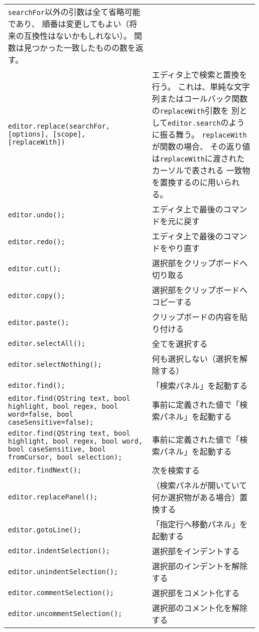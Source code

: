 \begin{longtable}{XX}
    \texttt{searchFor}以外の引数は全て省略可能であり、
    順番は変更してもよい（将来の互換性はないかもしれない）。
    関数は見つかった一致したものの数を返す。\\
  \texttt{editor.replace(searchFor, {[}options{]}, {[}scope{]}, {[}replaceWith{]})}
    & エディタ上で検索と置換を行う。
    これは、単純な文字列またはコールバック関数の\texttt{replaceWith}引数を
    別として\texttt{editor.search}のように振る舞う。
    \texttt{replaceWith}が関数の場合、
    その返り値は\texttt{replaceWith}に渡されたカーソルで表される
    一致物を置換するのに用いられる。\\
  \texttt{editor.undo();} & エディタ上で最後のコマンドを元に戻す\\
  \texttt{editor.redo();} & エディタ上で最後のコマンドをやり直す\\
  \texttt{editor.cut();} & 選択部をクリップボードへ切り取る\\
  \texttt{editor.copy();} & 選択部をクリップボードへコピーする\\
  \texttt{editor.paste();} & クリップボードの内容を貼り付ける\\
  \texttt{editor.selectAll();} & 全てを選択する\\
  \texttt{editor.selectNothing();} & 何も選択しない（選択を解除する）\\
  \texttt{editor.find();} & 「検索パネル」を起動する\\
  \texttt{editor.find(QString text, bool highlight, bool regex, bool word=false, bool caseSensitive=false);}
    & 事前に定義された値で「検索パネル」を起動する\\
  \texttt{editor.find(QString text, bool highlight, bool regex, bool word, bool caseSensitive, bool fromCursor, bool selection);}
    & 事前に定義された値で「検索パネル」を起動する\\
  \texttt{editor.findNext();} & 次を検索する\\
  \texttt{editor.replacePanel();} & （検索パネルが開いていて何か選択物がある場合）置換する\\
  \texttt{editor.gotoLine();} & 「指定行へ移動パネル」を起動する\\
  \texttt{editor.indentSelection();} & 選択部をインデントする\\
  \texttt{editor.unindentSelection();} & 選択部のインデントを解除する\\
  \texttt{editor.commentSelection();} & 選択部をコメント化する\\
  \texttt{editor.uncommentSelection();} & 選択部のコメント化を解除する\\

\end{longtable}
